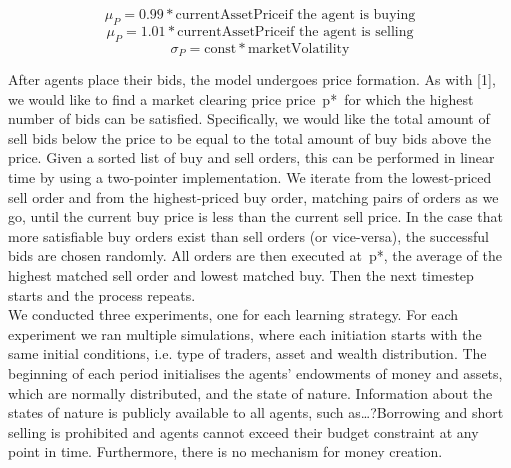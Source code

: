 \documentclass[11pt]{article}
\begin{document}
\begin{equation}
\mu_P = 0.99 * \text{currentAssetPrice} \text{if the agent is buying}
\end{equation}
\begin{equation}
\mu_P = 1.01 * \text{currentAssetPrice} \text{if the agent is selling}
\end{equation}
\begin{equation}
\sigma_P = \text{const} * \text{marketVolatility}
\end{equation}

After agents place their bids, the model undergoes price formation. As with [1], we would like to find a market clearing price price p* for which the highest number of bids can be satisfied. Specifically, we would like the total amount of sell bids below the price to be equal to the total amount of buy bids above the price. Given a sorted list of buy and sell orders, this can be performed in linear time by using a two-pointer implementation. We iterate from the lowest-priced sell order and from the highest-priced buy order, matching pairs of orders as we go, until the current buy price is less than the current sell price. In the case that more satisfiable buy orders exist than sell orders (or vice-versa), the successful bids are chosen randomly. All orders are then executed at p*, the average of the highest matched sell order and lowest matched buy. Then the next timestep starts and the process repeats. \\
We conducted three experiments, one for each learning strategy. For each experiment we ran multiple simulations, where each initiation starts with the same initial conditions, i.e. type of traders, asset and wealth distribution.  The beginning of each period initialises the agents’ endowments of money and assets, which are normally distributed, and the state of nature. Information about the states of nature is publicly available to all agents, such as…?Borrowing and short selling is prohibited and agents cannot exceed their budget constraint at any point in time. Furthermore, there is no mechanism for money creation.\\
\end{document}
